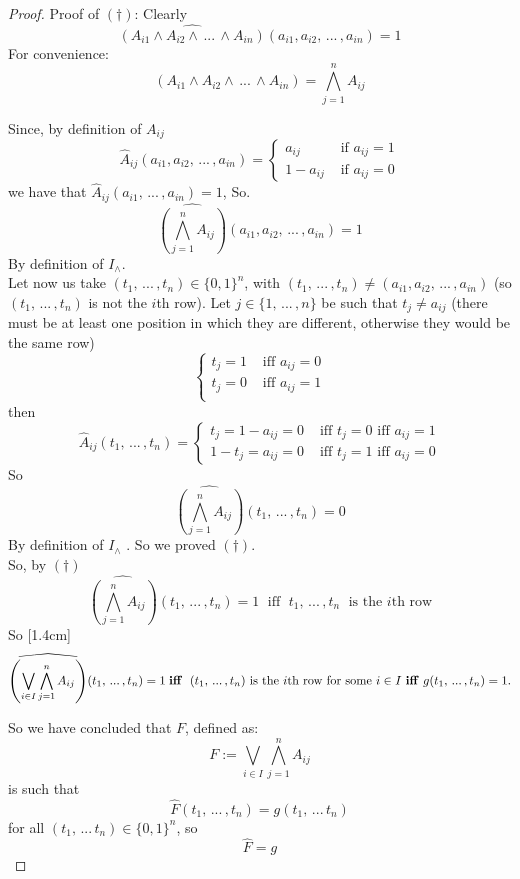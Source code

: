 \begin{proof}
		\noindent
		Proof of $(\dag)$: Clearly
		$$ \widehat{\left(A_{i1} \wedge A_{i2} \wedge \, ... \, \wedge A_{in}\right)} (a_{i1}, a_{i2}, \, ... \, , a_{in}) = 1 $$
		For convenience:
		$$ \left(A_{i1} \wedge A_{i2} \wedge \, ... \, \wedge A_{in}\right) = \bigwedge_{j = 1}^n A_{ij} $$

		\noindent
		Since, by definition of $A_{ij}$
		$$ \hat A_{ij} (a_{i1}, a_{i2}, \, ... \, , a_{in})  = \begin{cases}
			a_{ij} & \text{ if } a_{ij} = 1\\
			1 - a_{ij} & \text{ if } a_{ij} = 0
		\end{cases}$$
		we have that $\hat A_{ij} (a_{i1}, \, ... \, , a_{in}) = 1$, So.
		$$ \widehat {\left(\bigwedge_{j = 1}^n A_{ij} \right)} (a_{i1}, a_{i2}, \, ... \, , a_{in}) = 1$$
		By definition of $I_\wedge$.\\

		\noindent
		Let now us take $(t_1, \, ... \, , t_n) \in \{0,1\}^n$, with $(t_1, \, ... \, , t_n) \neq (a_{i1}, a_{i2}, \, ... \, , a_{in})$ (so $(t_1, \, ... \, , t_n)$ is not the $i$th row). Let $j \in \{1, \, ... \, , n\}$ be such that $t_j \neq a_{ij}$ (there must be at least one position in which they are different, otherwise they would be the same row)
		$$
		\begin{cases}
			t_j = 1 & \text{ iff } a_{ij} = 0 \\
			t_j = 0 & \text{ iff } a_{ij} = 1 \\
		\end{cases}
		$$
		then
		$$ \hat A_{ij} (t_1, \, ... \, , t_n) =
		\begin{cases}
			t_j = 1 - a_{ij} = 0 & \text{ iff } t_j = 0 \text{ iff }  a_{ij} = 1 \\
			1 - t_j = a_{ij} = 0 & \text{ iff } t_j = 1 \text{ iff }  a_{ij} = 0
		\end{cases}
		$$
		So
		$$ \widehat{\left( \bigwedge_{j=1}^n A_{ij} \right)}(t_1, \, ... \, , t_n) = 0$$
		By definition of $I_\wedge$ . So we proved $(\dag)$.\\
		\noindent
		So, by $(\dag)$
		$$ \widehat{\left( \bigwedge_{j=1}^n A_{ij} \right)} (t_1, \, ... \, , t_n) = 1 \; \text{ iff } \; t_1, \, ... \, , t_n \; \text{ is the } i \text{th row} $$
		So [1.4cm]
		$$\widehat{\left( \bigvee_{i \in I} \bigwedge_{j=1}^n A_{ij}\right)} (t_1, \, ... \, , t_n) = 1 \; \text{\textbf{iff}\; $(t_1, \, ... \, , t_n)$ is the $i$th row for some $i \in I$ \textbf{iff} $g(t_1, \, ... \, , t_n) = 1$.\\}$$

		\noindent
		So we have concluded that $F$, defined as:
		$$ F := \bigvee_{i \in I} \bigwedge_{j=1}^n A_{ij}$$
		is such that
		$$ \hat F (t_1, \, ... \, , t_n) = g(t_1, \, ... \, t_n) $$
		for all $(t_1, \, ... \, t_n) \in \{0,1\}^n$, so
		$$ \hat F = g $$
	\end{proof}

